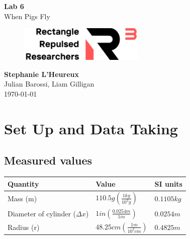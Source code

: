 \documentclass[11pt, letterpaper, includehead]{article}
\renewcommand{\arraystretch}{1.2}
\begin{document}
\begin{titlepage}
  \begin{center}
    \Huge{\textbf{Lab 6}}\\
    \Huge{When Pigs Fly}
    \vfill
    \begin{figure}[H] %
      \centering
      \includegraphics[width=6cm]{../logo.png}
    \end{figure}
    \large{\textbf{Stephanie L'Heureux}}\\
    \large{Julian Barossi, Liam Gilligan}\\
    \vspace{0.5cm}
    \normalsize
    \today
  \end{center}
\end{titlepage}

\tableofcontents
\pagebreak %

\pagestyle{fancy}
\fancyhead{}


\section{Set Up and Data Taking}


\renewcommand{\arraystretch}{2} 
\subsection{Measured values}
\begin{center}
  \begin{tabular}{|  m{5cm} | m{4cm} | m{3cm} | }
    \hline
    \textbf{Quantity} & \textbf{Value} & \textbf{SI units} \\
    \hline
    Mass  (m)  & $110.5g\left( \frac{1kg}{10^3g}\right)$ & $0.1105 kg$  \\
    \hline
    Diameter of cylinder ($\Delta x$) & $1in\left( \frac{0.0254m}{1in}\right)$ & $0.0254 m$  \\
    \hline
    Radius (r) & $48.25 cm \left( \frac{1m}{10^2cm}\right)$ & $0.4825 m$  \\
    \hline
  \end{tabular}
\end{center}
\renewcommand{\arraystretch}{1.5}
\end{document}
